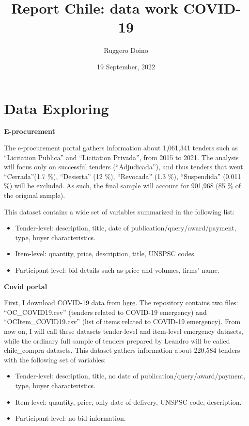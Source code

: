\documentclass[
]{article}
\title{Report Chile: data work COVID-19}
\author{Ruggero Doino}
\date{19 September, 2022}
\begin{document}
\maketitle

{
\setcounter{tocdepth}{2}
\tableofcontents
}
\hypertarget{data-exploring}{%
\section{Data Exploring}\label{data-exploring}}

\textbf{E-procurement}

The e-procurement portal gathers information about 1,061,341 tenders
such as ``Licitation Publica'' and ``Licitation Privada'', from 2015 to
2021. The analysis will focus only on successful tenders
(``Adjudicada''), and thus tenders that went ``Cerrada''(1.7 \%),
``Desierta'' (12 \%), ``Revocada'' (1.3 \%), ``Suspendida'' (0.011 \%)
will be excluded. As such, the final sample will account for 901,968 (85
\% of the original sample).

This dataset contains a wide set of variables summarized in the
following list:

\begin{itemize}
  \item Tender-level: description, title, date of publication/query/award/payment, type, buyer characteristics.
  \item Item-level: quantity, price, description, title, UNSPSC codes.
  \item Participant-level: bid details such as price and volumes, firms' name.
\end{itemize}

\textbf{Covid portal}

First, I download COVID-19 data from
\href{https://app.powerbi.com/view?r=eyJrIjoiNmU2NzBkNzUtYmM1Mi00NGVmLTljYWQtNTIxNTlhMTQ4ZjQ5IiwidCI6ImIwMGQ1ZjQ5LTk4YWMtNGJjNS1hMmM5LWNhZmRmNzEyMTZmMCIsImMiOjR9}{here}.
The repository contains two files: ``OC\_COVID19.csv'' (tenders related
to COVID-19 emergency) and ``OCItem\_COVID19.csv'' (list of items
related to COVID-19 emergency). From now on, I will call these datasets
tender-level and item-level emergency datasets, while the ordinary full
sample of tenders prepared by Leandro will be called chile\_compra
datasets. This dataset gathers information about 220,584 tenders with
the following set of variables:

\begin{itemize}
  \item Tender-level: description, title, no date of publication/query/award/payment, type, buyer characteristics.
  \item Item-level: quantity, price, only date of delivery, UNSPSC code, description. 
  \item Participant-level: no bid information.
\end{itemize}
\end{document}
